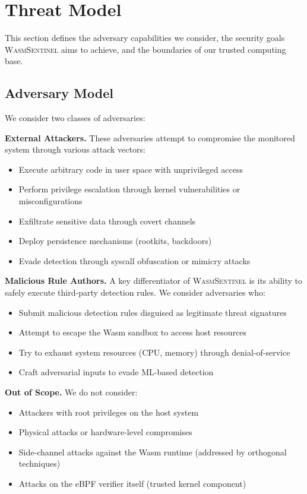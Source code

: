 
\section{Threat Model}
\label{sec:threat-model}

This section defines the adversary capabilities we consider, the security goals \textsc{WasmSentinel} aims to achieve, and the boundaries of our trusted computing base.

\subsection{Adversary Model}

We consider two classes of adversaries:

\textbf{External Attackers.}
These adversaries attempt to compromise the monitored system through various attack vectors:
\begin{itemize}
    \item Execute arbitrary code in user space with unprivileged access
    \item Perform privilege escalation through kernel vulnerabilities or misconfigurations
    \item Exfiltrate sensitive data through covert channels
    \item Deploy persistence mechanisms (rootkits, backdoors)
    \item Evade detection through syscall obfuscation or mimicry attacks
\end{itemize}

\textbf{Malicious Rule Authors.}
A key differentiator of \textsc{WasmSentinel} is its ability to safely execute third-party detection rules.
We consider adversaries who:
\begin{itemize}
    \item Submit malicious detection rules disguised as legitimate threat signatures
    \item Attempt to escape the Wasm sandbox to access host resources
    \item Try to exhaust system resources (CPU, memory) through denial-of-service
    \item Craft adversarial inputs to evade ML-based detection
\end{itemize}

\textbf{Out of Scope.}
We do not consider:
\begin{itemize}
    \item Attackers with root privileges on the host system
    \item Physical attacks or hardware-level compromises
    \item Side-channel attacks against the Wasm runtime (addressed by orthogonal techniques)
    \item Attacks on the eBPF verifier itself (trusted kernel component)
\end{itemize}

